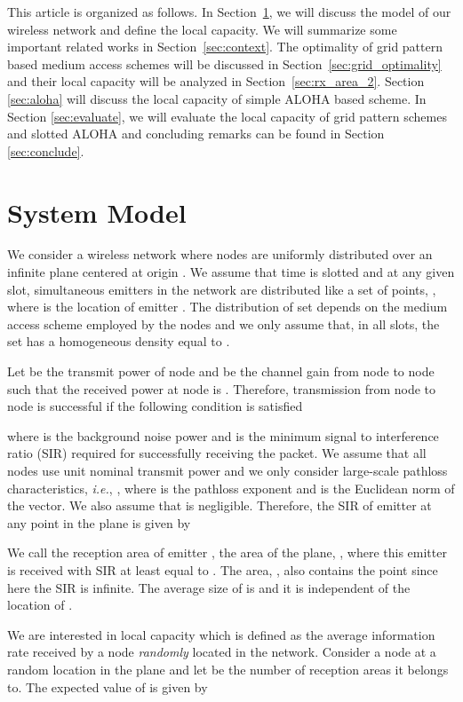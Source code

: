 \documentclass[12pt,english]{article}
\begin{document}
This article is organized as follows. In Section~\ref{sec:model}, we will discuss the model of our wireless network and define the local capacity. We will summarize some important related works in Section~\ref{sec:context}. The optimality of grid pattern based medium access schemes will be discussed in Section~\ref{sec:grid_optimality} and their local capacity will be analyzed in Section~\ref{sec:rx_area_2}. Section~ \ref{sec:aloha} will discuss the local capacity of simple ALOHA based scheme. In Section \ref{sec:evaluate}, we will evaluate the local capacity of grid pattern schemes and slotted ALOHA and concluding remarks can be found in Section \ref{sec:conclude}.

\section{System Model}
\label{sec:model}

We consider a wireless network where nodes are uniformly distributed over an infinite plane centered at origin . We assume that time is slotted and at any given slot, simultaneous emitters in the network are distributed like a set of points, \mbox{}, where  is the location of emitter . The distribution of set  depends on the medium access scheme employed by the nodes and we only assume that, in all slots, the set  has a homogeneous density equal to . 

Let  be the transmit power of node  and  be the channel gain from node  to node  such that the received power at node  is . Therefore, transmission from node  to node  is successful if the following condition is satisfied

where  is the background noise power and  is the minimum signal to interference ratio (SIR) required for successfully receiving the packet. We assume that all nodes use unit nominal transmit power and we only consider large-scale pathloss characteristics, {\it i.e.}, \mbox{}, where \mbox{} is the pathloss exponent and  is the Euclidean norm of the vector. We also assume that  is negligible. Therefore, the SIR of emitter  at any point  in the plane is given by
 

We call the reception area of emitter , the area of the plane, , where this emitter is received with SIR at least equal to . The area, , also contains the point  since here the SIR is infinite. The average size of  is  and it is independent of the location of .

We are interested in local capacity which is defined as the average information rate received by a node {\em randomly} located in the network. Consider a node at a random location  in the plane and let  be the number of reception areas it belongs to. The expected value of  is given by~\cite{Jacquet:2009}
\end{document}

